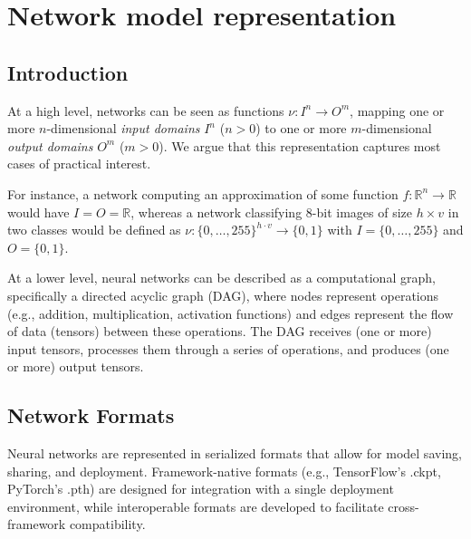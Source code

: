 \chapter{Network model representation}
\label{sec:model}

\section{Introduction}
\label{sec:model_intro}
At a high level, networks can be seen as functions 
$\nu : I^n \to O^m$, mapping one or more $n$-dimensional \emph{input domains}
$I^n$ ($n > 0$) to one or more $m$-dimensional \emph{output domains} $O^m$ ($m>0$). 
We argue that this representation captures most cases of practical
interest.

For instance, a network computing an approximation
of some function $f: \mathbb{R}^n \to \mathbb{R}$ would have $I = O =
\mathbb{R}$, whereas a network classifying 8-bit images of size $h \times v$ in
two classes would be defined as ${\nu: \{0,\ldots,255\}^{h \cdot v}
\to \{0, 1\}}$ with $I=\{0, \ldots, 255\}$ and $O = \{0,1\}$.

At a lower level, neural networks can be described as a computational graph, specifically a directed acyclic graph (DAG), where nodes represent operations 
(e.g., addition, multiplication, activation functions) and edges represent the flow of data (tensors) between these operations. The DAG receives (one or more) input tensors, 
processes them through a series of operations, and produces (one or more) output tensors.

\section{Network Formats}
\label{sec:model_formats}
Neural networks are represented in serialized formats that allow for model saving, sharing, and deployment. Framework-native formats (e.g., TensorFlow's .ckpt, PyTorch's .pth) are 
designed for integration with a single deployment environment, while interoperable formats are developed to facilitate cross-framework compatibility. 

